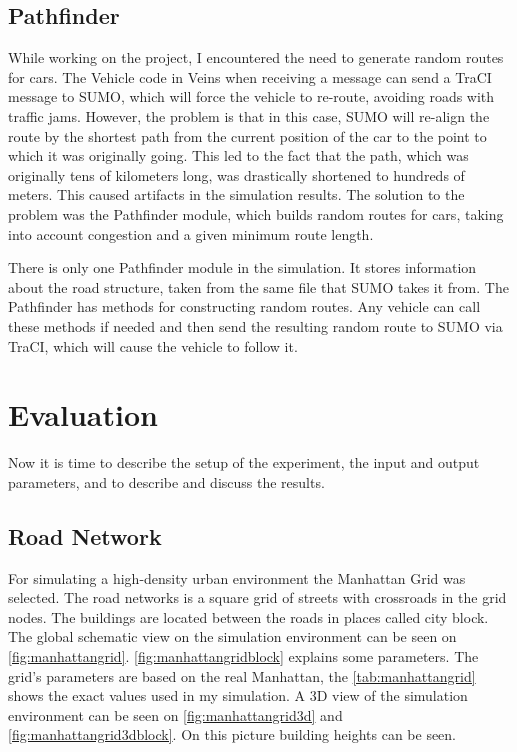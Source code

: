 \documentclass[]{nsm-thesis}
\begin{document}
\section{Pathfinder}

While working on the project, I encountered the need to generate random routes for cars. The Vehicle code in Veins when receiving a message can send a TraCI message to SUMO, which will force the vehicle to re-route, avoiding roads with traffic jams. However, the problem is that in this case, SUMO will re-align the route by the shortest path from the current position of the car to the point to which it was originally going. This led to the fact that the path, which was originally tens of kilometers long, was drastically shortened to hundreds of meters. This caused artifacts in the simulation results. The solution to the problem was the Pathfinder module, which builds random routes for cars, taking into account congestion and a given minimum route length.

There is only one Pathfinder module in the simulation. It stores information about the road structure, taken from the same file that SUMO takes it from. The Pathfinder has methods for constructing random routes. Any vehicle can call these methods if needed and then send the resulting random route to SUMO via TraCI, which will cause the vehicle to follow it.



\chapter{Evaluation}

Now it is time to describe the setup of the experiment, the input and output parameters, and to describe and discuss the results.



\section{Road Network}

For simulating a high-density urban environment the Manhattan Grid was selected. The road networks is a square grid of streets with crossroads in the grid nodes. The buildings are located between the roads in places called city block. The global schematic view on the simulation environment can be seen on \cref{fig:manhattangrid}. \cref{fig:manhattangridblock} explains some parameters. The grid's parameters are based on the real Manhattan, the \cref{tab:manhattangrid} shows the exact values used in my simulation. A 3D view of the simulation environment can be seen on \cref{fig:manhattangrid3d} and \cref{fig:manhattangrid3dblock}. On this picture building heights can be seen.
\end{document}
